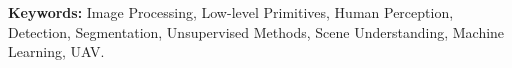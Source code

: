 %
%


%

\vspace*{\fill}

\textbf{Keywords:} Image Processing, Low-level Primitives, Human Perception, Detection, Segmentation, Unsupervised Methods, Scene Understanding, Machine Learning, UAV.